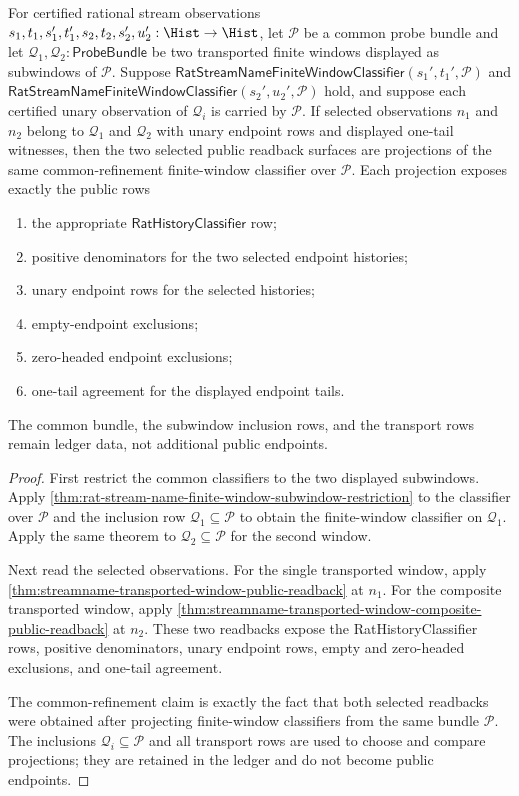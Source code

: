 \begin{theorem}
\label{thm:streamname-transported-window-common-refinement-public-readback}
For certified rational stream observations $s_1,t_1,s_1',t_1',
s_2,t_2,s_2',u_2':\Hist\to\Hist$, let $\mathcal{P}$ be a common probe bundle
and let $\mathcal{Q}_1,\mathcal{Q}_2:\mathsf{ProbeBundle}$ be two transported
finite windows displayed as subwindows of $\mathcal{P}$. Suppose
$\mathsf{RatStreamNameFiniteWindowClassifier}(s_1',t_1',\mathcal{P})$ and
$\mathsf{RatStreamNameFiniteWindowClassifier}(s_2',u_2',\mathcal{P})$ hold, and
suppose each certified unary observation of $\mathcal{Q}_i$ is carried by
$\mathcal{P}$. If selected observations $n_1$ and $n_2$ belong to
$\mathcal{Q}_1$ and $\mathcal{Q}_2$ with unary endpoint rows and displayed
one-tail witnesses, then the two selected public readback surfaces are
projections of the same common-refinement finite-window classifier over
$\mathcal{P}$. Each projection exposes exactly the public rows
\begin{enumerate}
  \item the appropriate $\mathsf{RatHistoryClassifier}$ row;
  \item positive denominators for the two selected endpoint histories;
  \item unary endpoint rows for the selected histories;
  \item empty-endpoint exclusions;
  \item zero-headed endpoint exclusions;
  \item one-tail agreement for the displayed endpoint tails.
\end{enumerate}
The common bundle, the subwindow inclusion rows, and the transport rows remain
ledger data, not additional public endpoints.
\end{theorem}
\begin{proof}
First restrict the common classifiers to the two displayed subwindows. Apply
\autoref{thm:rat-stream-name-finite-window-subwindow-restriction} to the
classifier over $\mathcal{P}$ and the inclusion row
$\mathcal{Q}_1\subseteq\mathcal{P}$ to obtain the finite-window classifier on
$\mathcal{Q}_1$. Apply the same theorem to
$\mathcal{Q}_2\subseteq\mathcal{P}$ for the second window.

Next read the selected observations. For the single transported window, apply
\autoref{thm:streamname-transported-window-public-readback} at $n_1$. For the
composite transported window, apply
\autoref{thm:streamname-transported-window-composite-public-readback} at $n_2$.
These two readbacks expose the RatHistoryClassifier rows, positive
denominators, unary endpoint rows, empty and zero-headed exclusions, and
one-tail agreement.

The common-refinement claim is exactly the fact that both selected readbacks
were obtained after projecting finite-window classifiers from the same bundle
$\mathcal{P}$. The inclusions $\mathcal{Q}_i\subseteq\mathcal{P}$ and all
transport rows are used to choose and compare projections; they are retained in
the ledger and do not become public endpoints.
\end{proof}

